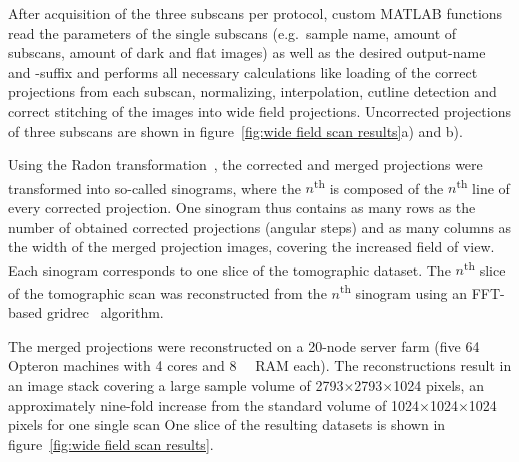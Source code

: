 After acquisition of the three subscans per protocol, custom MATLAB functions read the parameters of the single subscans (e.g.\ sample name, amount of subscans, amount of dark and flat images) as well as the desired output-name and -suffix and performs all necessary calculations like loading of the correct projections from each subscan, normalizing, interpolation, cutline detection and correct stitching of the images into wide field projections. Uncorrected projections of three subscans are shown in figure~\ref{fig:wide field scan results}a) and b).%

Using the Radon transformation~\cite{Radon1917}, the corrected and merged projections were transformed into so-called sinograms, where the $n$\textsuperscript{th} is composed of the $n$\textsuperscript{th} line of every corrected projection. One sinogram thus contains as many rows as the number of obtained corrected projections (angular steps) and as many columns as the width of the merged projection images, covering the increased field of view. Each sinogram corresponds to one slice of the tomographic dataset. The $n$\textsuperscript{th} slice of the tomographic scan was reconstructed from the $n$\textsuperscript{th} sinogram using an FFT-based gridrec~\cite{Dowd1999} algorithm.

The merged projections were reconstructed on a 20-node server farm (five \SI{64}{\bit} Opteron machines with 4 cores and \SI{8}{\giga\byte} RAM each). The reconstructions result in an image stack covering a large sample volume of 2793$\times$2793$\times$1024 pixels, an approximately nine-fold increase from the standard volume of 1024$\times$1024$\times$1024 pixels for one single scan One slice of the resulting datasets is shown in figure~\ref{fig:wide field scan results}.